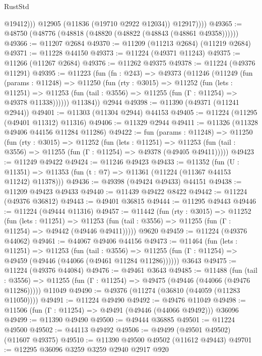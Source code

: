 \begin{lexlean}{RustStd}
\begin{coremodule}
                  @19412)))
            @12905
            (@11836 (@19710 @2922 @12034))
            @12917))))
@49365 := @48750 (@48776 (@48818 (@48820 (@48822 (@48843 (@48861 @49358))))))
@49366 := @11207 @2684
@49370 := @11209 (@11213 @2684) (@11219 @2684)
@49371 := @11228 @44150
@49373 := @11224 (@49371 @11243)
@49375 := @11266 (@11267 @2684)
@49376 := @11262 @49375
@49378 := @11224 (@49376 @11291)
@49395 := @11223
    (fun (fn : @243) =>
    @49373
      (@11246
        (@11249
          (fun (params : @11248) =>
          @11250
            (fun (rty : @3015) =>
            @11252
              (fun (lets : @11251) =>
              @11253 (fun (tail : @3556) => @11255 (fun (Γ : @11254) => @49378 @11338))))))
        @11384))
    @2944
@49398 := @11390 (@49371 (@11241 @2944))
@49401 := @11303 (@11304 @2944) @44153
@49405 := @11224 (@11295 (@49401 @11312) @11316)
@49406 := @11329 @2944
@49411 := @11326 (@11328 @49406 @44156 @11284 @11286)
@49422 := fun (params : @11248) =>
  @11250
    (fun (rty : @3015) =>
    @11252
      (fun (lets : @11251) =>
      @11253 (fun (tail : @3556) => @11255 (fun (Γ : @11254) => @49378 (@49405 @49411)))))
@49423 := @11249 @49422
@49424 := @11246 @49423
@49433 := @11352
    (fun (U : @11351) => @11353 (fun (t : @7) => @11361 (@11224 (@11367 @44153 @11242) @11378)))
@49436 := @49398 (@49424 @49433) @44151
@49438 := @11209 @49423 @49433
@49440 := @11439 @49422 @8422
@49442 := @11224 (@49376 @36812)
@49443 := @49401 @36815
@49444 := @11295 @49443
@49446 := @11224 (@49444 @11316)
@49457 := @11442
    (fun (rty : @3015) =>
    @11252
      (fun (lets : @11251) =>
      @11253 (fun (tail : @3556) => @11255 (fun (Γ : @11254) => @49442 (@49446 @49411)))))
    @9620
@49459 := @11224 (@49376 @44062)
@49461 := @44067 @49406 @44156
@49473 := @11464
    (fun (lets : @11251) =>
    @11253
      (fun (tail : @3556) =>
      @11255 (fun (Γ : @11254) => @49459 (@49446 (@44066 (@49461 @11284 @11286))))))
    @3643
@49475 := @11224 (@49376 @44084)
@49476 := @49461 @3643
@49485 := @11488
    (fun (tail : @3556) => @11255 (fun (Γ : @11254) => @49475 (@49446 (@44066 (@49476 @11286)))))
    @11049
@49490 := @49376 (@11274 (@36810 (@44059 (@11283 @11050))))
@49491 := @11224 @49490
@49492 := @49476 @11049
@49498 := @11506 (fun (Γ : @11254) => @49491 (@49446 (@44066 @49492))) @36096
@49499 := @11390 @49490
@49500 := @49444 @36885
@49501 := @11224 @49500
@49502 := @44113 @49492
@49506 := @49499 (@49501 @49502) (@11607 @49375)
@49510 := @11390 @49500 @49502 (@11612 @49443)
@49701 := @12295
    @36096
    @3259
    @3259
    @2940
    @2917
    @920

\end{coremodule}
\end{lexlean}

